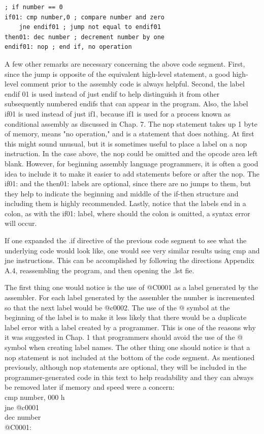\documentclass[10pt]{article}
\begin{document}
\begin{verbatim}
; if number == 0
if01: cmp number,0 ; compare number and zero
    jne endif01 ; jump not equal to endif01
then01: dec number ; decrement number by one
endif01: nop ; end if, no operation
\end{verbatim}

A few other remarks are necessary concerning the above code segment. First, since the jump is opposite of the equivalent high-level statement, a good high-level comment prior to the assembly code is always helpful. Second, the label endif 01 is used instead of just endif to help distinguish it from other subsequently numbered endifs that can appear in the program. Also, the label if01 is used instead of just if1, because if1 is used for a process known as conditional assembly as discussed in Chap. 7. The nop statement takes up 1 byte of memory, means "no operation," and is a statement that does nothing. At first this might sound unusual, but it is sometimes useful to place a label on a nop instruction. In the case above, the nop could be omitted and the opcode area left blank. However, for beginning assembly language programmers, it is often a good idea to include it to make it easier to add statements before or after the nop. The if01: and the then01: labels are optional, since there are no jumps to them, but they help to indicate the beginning and middle of the if-then structure and including them is highly recommended. Lastly, notice that the labels end in a colon, as with the if01: label, where should the colon is omitted, a syntax error will occur.

If one expanded the .if directive of the previous code segment to see what the underlying code would look like, one would see very similar results using cmp and jne instructions. This can be accomplished by following the directions Appendix A.4, reassembling the program, and then opening the .lst fie.

The first thing one would notice is the use of @C0001 as a label generated by the assembler. For each label generated by the assembler the number is incremented so that the next label would be @c0002. The use of the @ symbol at the beginning of the label is to make it less likely that there would be a duplicate label error with a label created by a programmer. This is one of the reasons why it was suggested in Chap. 1 that programmers should avoid the use of the @ symbol when creating label names. The other thing one should notice is that a nop statement is not included at the bottom of the code segment. As mentioned previously, although nop statements are optional, they will be included in the programmer-generated code in this text to help readability and they can always be removed later if memory and speed were a concern:\\
cmp number, 000 h\\
jne @c0001\\
dec number\\
@C0001:
\end{document}
